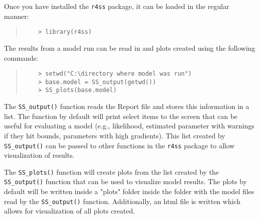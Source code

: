 Once you have installed the \texttt{r4ss} package, it can be loaded in the regular manner:

\begin{quote}
	\begin{verbatim}
	> library(r4ss)
	\end{verbatim}
\end{quote}


The results from a model run can be read in and plots created using the following commands:

\begin{quote}
	\begin{verbatim}
	> setwd("C:\directory where model was run")
	> base.model = SS_output(getwd())
	> SS_plots(base.model)
	\end{verbatim}
\end{quote}

The \texttt{SS\_output()} function reads the Report file and stores this information in a list. The function by default will print select items to the screen that can be useful for evaluating a model (e.g., likelihood, estimated parameter with warnings if they hit bounds, parameters with high gradients). This list created by \texttt{SS\_output()} can be passed to other functions in the \texttt{r4ss} package to allow visualization of results.

The \texttt{SS\_plots()} function will create plots from the list created by the \texttt{SS\_output()} function that can be used to visualize model results.  The plots by default will be written inside a "plots" folder inside the folder with the model files read by the \texttt{SS\_output()} function.  Additionally, an html file is written which allows for visualization of all plots created.   


